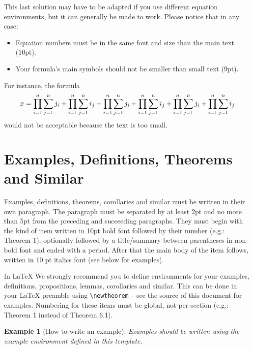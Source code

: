 \documentclass{article}
\newtheorem{example}{Example}
\begin{document}
This last solution may have to be adapted if you use different equation environments, but it can generally be made to work. Please notice that in any case:

\begin{itemize}
    \item Equation numbers must be in the same font and size than the main text (10pt).
    \item Your formula's main symbols should not be smaller than {\small small} text (9pt).
\end{itemize}

For instance, the formula
%
\begin{equation}
    \resizebox{.91\linewidth}{!}{$
    \displaystyle
    x = \prod_{i=1}^n \sum_{j=1}^n j_i + \prod_{i=1}^n \sum_{j=1}^n i_j + \prod_{i=1}^n \sum_{j=1}^n j_i + \prod_{i=1}^n \sum_{j=1}^n i_j + \prod_{i=1}^n \sum_{j=1}^n j_i + \prod_{i=1}^n \sum_{j=1}^n i_j
$}
\end{equation}
% 
would not be acceptable because the text is too small.

\section{Examples, Definitions, Theorems and Similar}

Examples, definitions, theorems, corollaries and similar must be written in their own paragraph. The paragraph must be separated by at least 2pt and no more than 5pt from the preceding and succeeding paragraphs. They must begin with the kind of item written in 10pt bold font followed by their number (e.g.: Theorem 1), optionally followed by a title/summary between parentheses in non-bold font and ended with a period. After that the main body of the item follows, written in 10 pt italics font (see below for examples). 

In \LaTeX{} We strongly recommend you to define environments for your examples, definitions, propositions, lemmas, corollaries and similar. This can be done in your \LaTeX{} preamble using \texttt{\textbackslash{newtheorem}} -- see the source of this document for examples. Numbering for these items must be global, not per-section (e.g.: Theorem 1 instead of Theorem 6.1).

\begin{example}[How to write an example]
Examples should be written using the example environment defined in this template.
\end{example}
\end{document}
